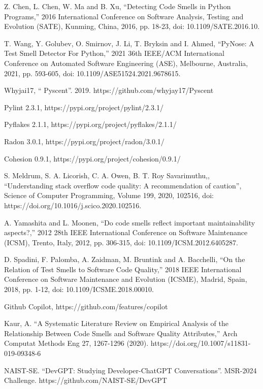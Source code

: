 \documentclass[conference]{IEEEtran}
\begin{document}
\begin{thebibliography}{00}
    Z. Chen, L. Chen, W. Ma and B. Xu, ``Detecting Code Smells in Python Programs,'' 2016 International Conference on Software Analysis, Testing and Evolution (SATE), Kunming, China, 2016, pp. 18-23, doi: 10.1109/SATE.2016.10.

   T. Wang, Y. Golubev, O. Smirnov, J. Li, T. Bryksin and I. Ahmed, ``PyNose: A Test Smell Detector For Python,'' 2021 36th IEEE/ACM International Conference on Automated Software Engineering (ASE), Melbourne, Australia, 2021, pp. 593-605, doi: 10.1109/ASE51524.2021.9678615.

   Whyjai17, `` Pyscent''. 2019. https://github.com/whyjay17/Pyscent

   Pylint 2.3.1, https://pypi.org/project/pylint/2.3.1/

   Pyflakes 2.1.1, https://pypi.org/project/pyflakes/2.1.1/

   Radon 3.0.1, https://pypi.org/project/radon/3.0.1/

   Cohesion 0.9.1, https://pypi.org/project/cohesion/0.9.1/

   S. Meldrum, S. A. Licorish, C. A. Owen, B. T. Roy Savarimuthu,, ``Understanding stack overflow code quality: A recommendation of caution'', Science of Computer Programming, Volume 199, 2020, 102516, doi: https://doi.org/10.1016/j.scico.2020.102516.

   A. Yamashita and L. Moonen, ``Do code smells reflect important maintainability aspects?,'' 2012 28th IEEE International Conference on Software Maintenance (ICSM), Trento, Italy, 2012, pp. 306-315, doi: 10.1109/ICSM.2012.6405287.

   D. Spadini, F. Palomba, A. Zaidman, M. Bruntink and A. Bacchelli, ``On the Relation of Test Smells to Software Code Quality,'' 2018 IEEE International Conference on Software Maintenance and Evolution (ICSME), Madrid, Spain, 2018, pp. 1-12, doi: 10.1109/ICSME.2018.00010.

   Github Copilot, https://github.com/features/copilot

   Kaur, A. ``A Systematic Literature Review on Empirical Analysis of the Relationship Between Code Smells and Software Quality Attributes,'' Arch Computat Methods Eng 27, 1267-1296 (2020). https://doi.org/10.1007/s11831-019-09348-6

   NAIST-SE. ``DevGPT: Studying Developer-ChatGPT Conversations''. MSR-2024 Challenge. https://github.com/NAIST-SE/DevGPT

\end{thebibliography}
\end{document}

